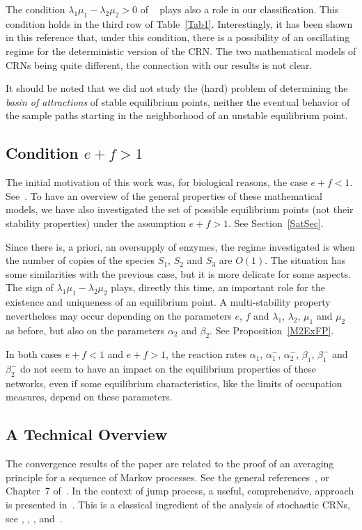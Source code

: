 \documentclass[english]{amsart}
\numberwithin{proposition}{section}
\begin{document}
The condition $\lambda_1\mu_1{-}\lambda_2\mu_2{>}0$ of ~\citet{Conradi2024} plays also a role in our classification. This condition holds in the third row of Table~\ref{Tab1}.  Interestingly, it has been shown in this reference that, under this condition, there is a possibility of an oscillating regime for the deterministic version of the CRN. The two mathematical models of CRNs being quite different, the connection with our results is not clear.

It should be noted that we did not study the (hard) problem of determining the {\em basin of attractions} of stable equilibrium points, neither the eventual behavior of the sample paths starting in the neighborhood of an unstable equilibrium point.

\subsection{Condition $e{+}f{>}1$}
The initial motivation of this work was, for biological reasons, the case $e{+}f{<}1$.  See~\citet{Albe}. To have an overview of the general properties of these mathematical models, we have also investigated the set of possible equilibrium points (not their stability properties) under the assumption $e{+}f{>}1$. See Section~\ref{SatSec}.

Since there is, a priori, an oversupply of enzymes, the regime investigated is when the number of copies of the species ${ S}_1$, ${ S}_2$ and ${ S}_3$ are $O(1)$. The situation has some similarities with the previous case, but it is more delicate for some aspects. The sign of $\lambda_1\mu_1{-}\lambda_2\mu_2$ plays, directly this time,  an important role for the existence and uniqueness of an equilibrium point. A multi-stability property nevertheless may occur  depending on the parameters $e$, $f$ and $\lambda_1$, $\lambda_2$, $\mu_1$ and $\mu_2$ as before, but also  on the parameters $\alpha_2$ and $\beta_2$. See Proposition~\ref{M2ExFP}. 
 
In both cases  $e{+}f{<}1$ and  $e{+}f{>}1$, the reaction rates $\alpha_1$, $\alpha_1^-$, $\alpha_2^-$, $\beta_1$, $\beta_1^-$ and $\beta_2^-$ do not seem to have an impact on the equilibrium properties of these networks, even if some  equilibrium characteristics, like the limits of occupation measures,  depend on these parameters. 


\subsection{A Technical Overview}
The convergence results of the paper are related to the proof of an averaging principle for a sequence of Markov processes. See the general references~\citet{Khasminskii1}, \citet{Papanicolaou} or Chapter~7 of~\citet{Freidlin}. In the context of jump process, a useful, comprehensive, approach is presented in~\citet{Kurtz1992}. This is a classical ingredient of the analysis of stochastic CRNs, see \citet{BallKurtz}, \citet{KangKurtz}, \citet{Kim2017},  and~\citet{LR24-2,LR23,LR24}.
\end{document}
